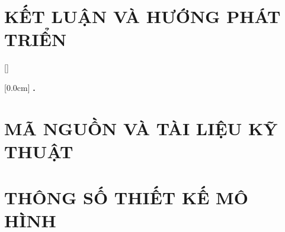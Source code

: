 \documentclass[a4paper,13pt,3p,twoside]{report}
\renewcommand{\bibname}{Danh_sach_tai_lieu_tham_khao}
\theoremstyle{definition}
\begin{document}
\newpage
\chapter{KẾT LUẬN VÀ HƯỚNG PHÁT TRIỂN}
\label{chuong5}



\newpage
\renewcommand\bibname{TÀI LIỆU THAM KHẢO}
\printbibliography
{}

\appendixpage
\appendices
\addappheadtotoc


{}[]
\titlespacing*{\chapter}{0pt}{-20pt}{20pt}

    [0.0cm]             %
    {\bfseries\vspace{0.3cm}}                  %
    {{\bfseries{\scshape} \thecontentslabel.\ }} %
    {}         %
    {\contentspage}         %
\chapter{MÃ NGUỒN VÀ TÀI LIỆU KỸ THUẬT}

\newpage
\chapter{THÔNG SỐ THIẾT KẾ MÔ HÌNH}

\end{document}
